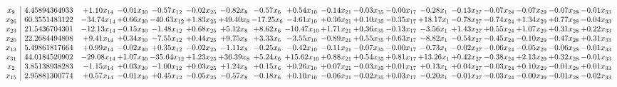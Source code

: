 \documentclass[9pt]{article}
\begin{document}
 \[\begin{array}{c| c c@{\hskip 2pt} c@{\hskip 2pt} c@{\hskip 2pt} c@{\hskip 2pt} c@{\hskip 2pt} c@{\hskip 2pt} c@{\hskip 2pt} c@{\hskip 2pt} c@{\hskip 2pt} c@{\hskip 2pt} c@{\hskip 2pt} c@{\hskip 2pt} c@{\hskip 2pt} c@{\hskip 2pt} c@{\hskip 2pt} c@{\hskip 2pt} }
 x_{9}   &  4.45894364933 & +  1.10 x_{14} & -0.01 x_{30} & -0.57 x_{12} & -0.02 x_{25} & -0.82 x_{8} & -0.57 x_{6} & +  0.54 x_{10} & -0.14 x_{21} & -0.03 x_{35} & -0.00 x_{17} & -0.28 x_{1} & -0.13 x_{27} & -0.07 x_{24} & -0.07 x_{29} & -0.07 x_{28} & -0.01 x_{33}\\
 x_{26}   &  60.3551483122 & -34.74 x_{14} & +  0.66 x_{30} & -40.63 x_{12} & +  1.83 x_{25} & + 49.40 x_{8} & -17.25 x_{6} & -4.61 x_{10} & +  0.36 x_{21} & +  0.10 x_{35} & -0.35 x_{17} & + 18.17 x_{1} & -0.78 x_{27} & -0.74 x_{24} & +  1.34 x_{29} & +  0.77 x_{28} & -0.04 x_{33}\\
 x_{23}   &  21.5436704301 & -12.13 x_{14} & -0.15 x_{30} & -1.48 x_{12} & +  0.68 x_{25} & +  5.12 x_{8} & +  8.62 x_{6} & -10.47 x_{10} & +  1.71 x_{21} & +  0.36 x_{35} & -0.13 x_{17} & -3.56 x_{1} & +  1.43 x_{27} & +  0.55 x_{24} & +  1.07 x_{29} & +  0.31 x_{28} & +  0.22 x_{33}\\
 x_{20}   &  22.2684494808 & +  9.41 x_{14} & +  0.34 x_{30} & -7.55 x_{12} & +  0.44 x_{25} & +  9.75 x_{8} & +  3.33 x_{6} & -3.55 x_{10} & -0.89 x_{21} & +  0.55 x_{35} & +  0.63 x_{17} & -8.82 x_{1} & -0.54 x_{27} & -0.45 x_{24} & -0.10 x_{29} & -0.47 x_{28} & +  0.31 x_{33}\\
 x_{13}   &  5.49861817664 & +  0.99 x_{14} & -0.02 x_{30} & +  0.35 x_{12} & -0.02 x_{25} & -1.11 x_{8} & -0.25 x_{6} & -0.42 x_{10} & -0.11 x_{21} & -0.07 x_{35} & -0.00 x_{17} & -0.73 x_{1} & -0.02 x_{27} & -0.06 x_{24} & -0.05 x_{29} & -0.06 x_{28} & -0.01 x_{33}\\
 x_{31}   &  44.0184520902 & -29.08 x_{14} & +  1.07 x_{30} & -35.64 x_{12} & +  1.23 x_{25} & + 36.39 x_{8} & +  5.24 x_{6} & + 15.62 x_{10} & +  0.88 x_{21} & +  0.54 x_{35} & +  0.81 x_{17} & + 13.26 x_{1} & +  0.42 x_{27} & -0.38 x_{24} & +  2.13 x_{29} & +  0.32 x_{28} & -0.01 x_{33}\\
 x_{2}   &  3.85138938283 & -1.15 x_{14} & +  0.03 x_{30} & -1.00 x_{12} & +  0.03 x_{25} & +  1.24 x_{8} & +  0.15 x_{6} & +  0.26 x_{10} & +  0.07 x_{21} & -0.03 x_{35} & +  0.01 x_{17} & +  0.13 x_{1} & +  0.04 x_{27} & -0.03 x_{24} & +  0.10 x_{29} & -0.01 x_{28} & +  0.01 x_{33}\\
 x_{15}   &  2.95881300774 & +  0.57 x_{14} & -0.01 x_{30} & +  0.45 x_{12} & -0.05 x_{25} & -0.57 x_{8} & -0.18 x_{6} & +  0.10 x_{10} & -0.06 x_{21} & -0.02 x_{35} & +  0.03 x_{17} & -0.20 x_{1} & -0.01 x_{27} & -0.03 x_{24} & -0.00 x_{29} & -0.01 x_{28} & -0.02 x_{33}\\

\end{array}\]
\end{document}
